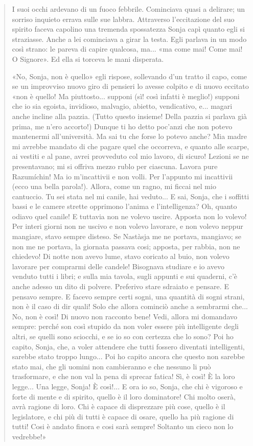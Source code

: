 \documentclass{book}
\newcounter{mar}
\begin{document}
\begin{quote}
I suoi occhi ardevano di un fuoco febbrile. Cominciava quasi a delirare; un sorriso inquieto
errava sulle sue labbra. Attraverso l'eccitazione del suo spirito faceva capolino una tremenda
spossatezza Sonja capì quanto egli si straziasse. Anche a lei cominciava a girar la testa. Egli
parlava in un modo così strano: le pareva di capire qualcosa, ma... «ma come mai! Come mai! O
Signore». Ed ella si torceva le mani disperata.

«No, Sonja, non è quello» egli rispose, sollevando d'un tratto il capo, come se un improvviso
nuovo giro di pensieri lo avesse colpito e di nuovo eccitato «non è quello! Ma piuttosto... supponi (sì! così infatti è meglio!) supponi che io sia egoista, invidioso, malvagio, abietto,
vendicativo, e... magari anche incline alla pazzia. (Tutto questo insieme! Della pazzia si parlava
già prima, me n'ero accorto!) Dunque ti ho detto poc'anzi che non potevo mantenermi
all'università. Ma sai tu che forse lo potevo anche? Mia madre mi avrebbe mandato di che
pagare quel che occorreva, e quanto alle scarpe, ai vestiti e al pane, avrei provveduto col mio
lavoro, di sicuro! Lezioni se ne presentavano; mi si offriva mezzo rublo per ciascuna. Lavora
pure Razumíchin! Ma io m'incattivii e non volli. Per l'appunto mi incattivii (ecco una bella
parola!). Allora, come un ragno, mi ficcai nel mio cantuccio. Tu sei stata nel mi canile, hai
veduto... E sai, Sonja, che i soffitti bassi e le camere strette opprimono l'anima e l'intelligenza?
Oh, quanto odiavo quel canile! E tuttavia non ne volevo uscire. Apposta non lo volevo! Per
interi giorni non ne uscivo e non volevo lavorare, e non volevo neppur mangiare, stavo sempre
disteso. Se Nastàsja me ne portava, mangiavo; se non me ne portava, la giornata passava cosi;
apposta, per rabbia, non ne chiedevo! Di notte non avevo lume, stavo coricato al buio, non
volevo lavorare per comprarmi delle candele! Bisognava studiare e io avevo venduto tutti i
libri; e sulla mia tavola, sugli appunti e sui quaderni, c'è anche adesso un dito di polvere.
Preferivo stare sdraiato e pensare. E pensavo sempre. E facevo sempre certi sogni, una
quantità di sogni strani, non è il caso di dir quali! Solo che allora cominciò anche a sembrarmi
che... No, non è così! Di nuovo non racconto bene! Vedi, allora mi domandavo sempre: perché
son così stupido da non voler essere più intelligente degli altri, se quelli sono sciocchi, e se io
so con certezza che lo sono? Poi ho capito, Sonja, che, a voler attendere che tutti fossero
diventati intelligenti, sarebbe stato troppo lungo... Poi ho capito ancora che questo non sarebbe
stato mai, che gli uomini non cambieranno e che nessuno li può trasformare, e che non val la
pena di sprecar fatica! Sì, è così! È la loro legge... Una legge, Sonja! È così!... E ora io so, Sonja,
che chi è vigoroso e forte di mente e di spirito, quello è il loro dominatore! Chi molto oserà,
avrà ragione di loro. Chi è capace di disprezzare più cose, quello è il legislatore, e chi più di tutti
è capace di osare, quello ha più ragione di tutti! Cosi è andato finora e cosi sarà sempre!
Soltanto un cieco non lo vedrebbe!»


\end{quote}
\end{document}
